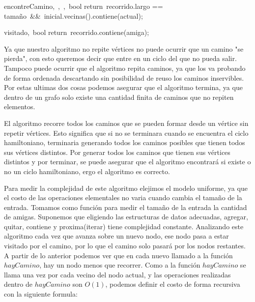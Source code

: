 \begin{algorithm}
{encontreCamino}{,\ ,\ ,\ }{bool}
    return\ recorrido.largo == tamaño\ \&\&\ inicial.vecinas().contiene(actual);
\end{algorithm}

\begin{algorithm}
{visitado}{,\ }{bool}
    return\ recorrido.contiene(amiga);
\end{algorithm}


    
Ya que nuestro algoritmo no repite vértices no puede ocurrir que un camino "se pierda", con esto queremos decir que entre en un ciclo del que no pueda salir. Tampoco puede ocurrir que el algoritmo repita caminos, ya que los va probando de forma ordenada descartando sin posibilidad de reuso los caminos inservibles. Por estas ultimas dos cosas podemos asegurar que el algoritmo termina, ya que dentro de un grafo solo existe una cantidad finita de caminos que no repiten elementos.

El algoritmo recorre todos los caminos que se pueden formar desde un vértice sin repetir vértices. Esto significa que si no se terminara cuando se encuentra el ciclo hamiltoniano, terminaria generando todos los caminos posibles que tienen todos sus vértices distintos. Por generar todos los caminos que tienen sus vértices distintos y por terminar, se puede asegurar que el algoritmo encontrará si existe o no un ciclo hamiltoniano, ergo el algoritmo es correcto.

Para medir la complejidad de este algoritmo elejimos el modelo uniforme, ya que el costo de las operaciones elementales no varia cuando cambia el tamaño de la entrada. Tomamos como función para medir el tamaño de la entrada la cantidad de amigas. Suponemos que eligiendo las estructuras de datos adecuadas, agregar, quitar, contiene y proxima(iterar) tiene complejidad constante. Analizando este algoritmo cada vez que avanza sobre un nuevo nodo, ese nodo pasa a estar visitado por el camino, por lo que el camino solo pasará por los nodos restantes. A partir de lo anterior podemos ver que en cada nuevo llamado a la función $hayCamino$, hay un nodo menos que recorrer. Como a la función $hayCamino$ se llama una vez por cada vecino del nodo actual, y las operaciones realizadas dentro de $hayCamino$ son $O(1)$, podemos definir el costo de forma recursiva con la siguiente formula:

